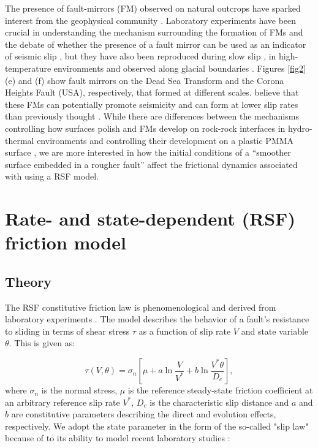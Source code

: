 \documentclass[preprint,1p, 10pt,authoryear]{elsarticle}
\begin{document}
The presence of fault-mirrors (FM) observed on natural outcrops have sparked interest from the geophysical community \citep{Fondriest2013,Kirkpatrick2013, Siman-Tov2013}.  Laboratory experiments have been crucial in understanding the mechanism surrounding the formation of FMs and the debate of whether the presence of a fault mirror can be used as an indicator of seismic slip \citep{Fondriest2013,Siman-Tov2013,Pozzi2018}, but they have also been reproduced during slow slip \citep{Tisato2012,Siman-Tov2015}, in high-temperature environments \citep{Pluymakers2017} and observed along glacial boundaries \citep{Siman-Tov2017}. Figures \ref{fig2}(e) and (f) show fault mirrors on the Dead Sea Transform and the Corona Heights Fault (USA), respectively, that formed at different scales.  \citet{Goldberg2016} believe that these FMs can potentially promote seismicity and can form at lower slip rates than previously thought \citep{Verberne2019}.  While there are differences between the mechanisms controlling how surfaces polish and FMs develop on rock-rock interfaces in hydro-thermal environments and controlling their development on a plastic PMMA surface \citep{Bouissou1998}, we are  more interested in how the initial conditions of a ``smoother surface embedded in a rougher fault'' affect the frictional dynamics associated with using a RSF model. 

\section{Rate- and state-dependent (RSF) friction model}
\subsection{Theory}
\label{Theory}
The RSF constitutive friction law is phenomenological and derived from laboratory experiments \citep{Dieterich1979, Ruina1983}.  The model describes the behavior of a fault's resistance to sliding in terms of shear stress $\tau$ as a function of slip rate $V$ and state variable $\theta$. This is given as:

\begin{equation}
\label{eq5}
\tau \left( V,\theta \right) = \sigma_{n} \left[\mu + a \ln\frac{V}{V^{*}} + b \ln\frac{V^{*}\theta}{D_{c}}\right],
\end{equation}   
\noindent where $\sigma_{n}$ is the normal stress, $\mu$ is the reference steady-state friction coefficient at an arbitrary reference slip rate $V^{*}$, $D_{c}$ is the characteristic slip distance and $a$ and $b$ are constitutive parameters describing the direct and evolution effects, respectively.  We adopt the state parameter in the form of the so-called "slip law" because of to its ability to model recent laboratory studies \citep{Bhattacharya2015, Kaneko2011, Kaneko2016}:
\end{document}
